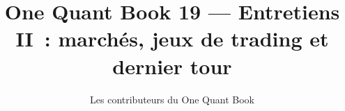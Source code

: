 \documentclass[11pt,a4paper,twoside,openany]{book}
\title{One Quant Book 19 --- Entretiens II~: marchés, jeux de trading et dernier tour}
\author{Les contributeurs du One Quant Book}
\date{\bookdate}
\begin{document}
\frontmatter



\tableofcontents

\mainmatter


\appendix
\part{\omsolutionspart}


\backmatter
\printindex
\end{document}
